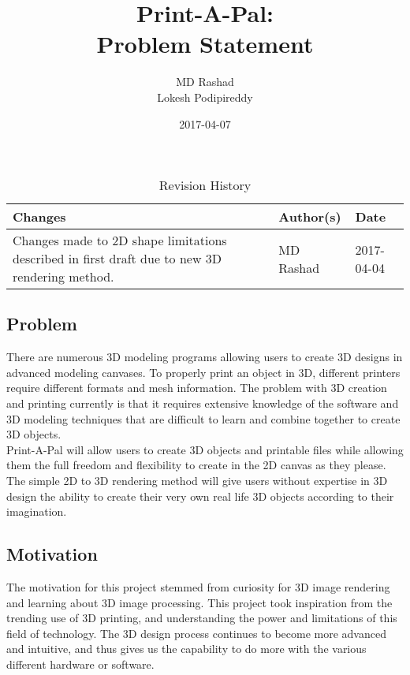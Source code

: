 \documentclass[12pt]{article}
\begin{document}
\title{
\LARGE Print-A-Pal:
\\\vspace{10mm}
\large \textbf{Problem Statement}
\vspace{40mm}
}
\author{
MD Rashad
\\Lokesh Podipireddy
\vspace{10mm}
}
\date{\vfill 2017-04-07}

\maketitle
\newpage

\begin{table}[h]
\centering
\caption{Revision History}
\begin{tabular}{p{9cm}ll}
\toprule
\textbf{Changes} & \textbf{Author(s)} & \textbf{Date}\\\midrule
Changes made to 2D shape limitations described in first draft due to new 3D rendering method. & MD Rashad & 2017-04-04\\\bottomrule
\end{tabular}
\end{table}

\subsection*{Problem}
There are numerous 3D modeling programs allowing users to create 3D designs in advanced modeling canvases.  To properly print an object in 3D, different printers require different formats and mesh information. The problem with 3D creation and printing currently is that it requires extensive knowledge of the software and 3D modeling techniques that are difficult to learn and combine together to create 3D objects.\\

\noindent Print-A-Pal will allow users to create 3D objects and printable files while allowing them the full freedom and flexibility to create in the 2D canvas as they please.  The simple 2D to 3D rendering method will give users without expertise in 3D design the ability to create their very own real life 3D objects according to their imagination.

\subsection*{Motivation}
The motivation for this project stemmed from curiosity for 3D image rendering and learning about 3D image processing. This project took inspiration from the trending use of 3D printing, and understanding the power and limitations of this field of technology.  The 3D design process continues to become more advanced and intuitive, and thus gives us the capability to do more with the various different hardware or software.\\
\end{document}
